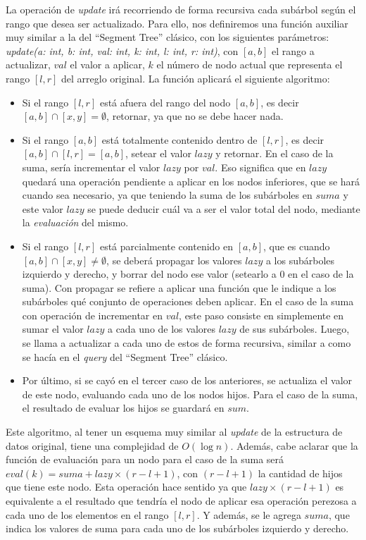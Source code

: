 \documentclass{article}
\begin{document}
La operación de \textit{update} irá recorriendo de forma recursiva cada subárbol según el rango que desea ser actualizado. Para ello, nos definiremos una función auxiliar muy similar a la del ``Segment Tree'' clásico, con los siguientes parámetros: \textit{update(a: int, b: int, val: int, k: int, l: int, r: int)}, con $[a,b]$ el rango a actualizar, $val$ el valor a aplicar, $k$ el número de nodo actual que representa el rango $[l,r]$ del arreglo original. La función aplicará el siguiente algoritmo:

\begin{itemize}
    \item Si el rango $[l,r]$ está afuera del rango del nodo $[a,b]$, es decir $[a,b]\cap[x,y] = \emptyset$, retornar, ya que no se debe hacer nada.
    \item Si el rango $[a,b]$ está totalmente contenido dentro de $[l,r]$, es decir $[a,b]\cap[l,r] = [a, b]$, setear el valor $lazy$ y retornar. En el caso de la suma, sería incrementar el valor $lazy$ por $val$. Eso significa que en $lazy$ quedará una operación pendiente a aplicar en los nodos inferiores, que se hará cuando sea necesario, ya que teniendo la suma de los subárboles en $suma$ y este valor $lazy$ se puede deducir cuál va a ser el valor total del nodo, mediante la \textit{evaluación} del mismo.
    \item Si el rango $[l,r]$ está parcialmente contenido en $[a,b]$, que es cuando $[a,b]\cap[x,y]\neq\emptyset$, se deberá propagar los valores $lazy$ a los subárboles izquierdo y derecho, y borrar del nodo ese valor (setearlo a $0$ en el caso de la suma). Con propagar se refiere a aplicar una función que le indique a los subárboles qué conjunto de operaciones deben aplicar. En el caso de la suma con operación de incrementar en $val$, este paso consiste en simplemente en sumar el valor $lazy$ a cada uno de los valores $lazy$ de sus subárboles. Luego, se llama a actualizar a cada uno de estos de forma recursiva, similar a como se hacía en el \textit{query} del ``Segment Tree'' clásico.
    \item Por último, si se cayó en el tercer caso de los anteriores, se actualiza el valor de este nodo, evaluando cada uno de los nodos hijos. Para el caso de la suma, el resultado de evaluar los hijos se guardará en $sum$.
\end{itemize}

Este algoritmo, al tener un esquema muy similar al \textit{update} de la estructura de datos original, tiene una complejidad de $O(\log n)$. Además, cabe aclarar que la función de evaluación para un nodo para el caso de la suma será $eval(k) = suma + lazy \times (r-l+1)$, con $(r-l+1)$ la cantidad de hijos que tiene este nodo. Esta operación hace sentido ya que $lazy \times (r-l+1)$ es equivalente a el resultado que tendría el nodo de aplicar esa operación perezosa a cada uno de los elementos en el rango $[l,r]$. Y además, se le agrega $suma$, que indica los valores de suma para cada uno de los subárboles izquierdo y derecho.
\end{document}
